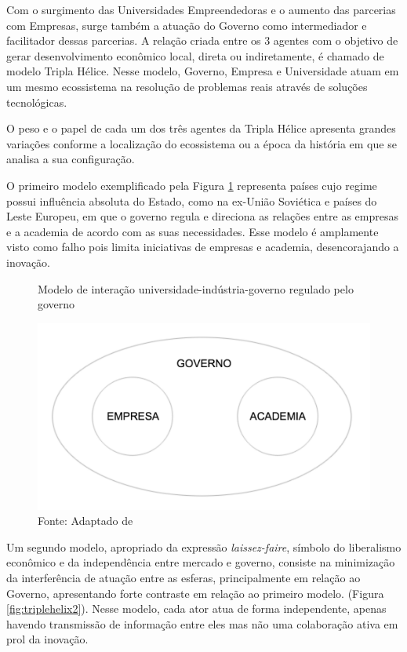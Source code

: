 Com o surgimento das Universidades Empreendedoras e o aumento das parcerias com Empresas, surge também a atuação do Governo como intermediador e facilitador dessas parcerias. A relação criada entre os 3 agentes com o objetivo de gerar desenvolvimento econômico local, direta ou indiretamente, é chamado de modelo Tripla Hélice. Nesse modelo, Governo, Empresa e Universidade atuam em um mesmo ecossistema na resolução de problemas reais através de soluções tecnológicas.

O peso e o papel de cada um dos três agentes da Tripla Hélice apresenta grandes variações conforme a localização do ecossistema ou a época da história em que se analisa a sua configuração. \cite{etzkowitz2000}

O primeiro modelo exemplificado pela Figura \ref{fig:triplehelix1} representa países  cujo regime possui influência absoluta do Estado, como na ex-União Soviética e países do Leste Europeu, em que o governo regula e direciona as relações entre as empresas e a academia de acordo com as suas necessidades. Esse modelo é amplamente visto como falho pois limita iniciativas de empresas e academia, desencorajando a inovação.

\begin{figure}[H]
\caption{Modelo de interação universidade-indústria-governo regulado pelo governo}
\centerline{\includegraphics[scale=0.5]{img/triplehelix1}}
\label{fig:triplehelix1}
\caption* {Fonte: Adaptado de }
\end{figure}

Um segundo modelo, apropriado da expressão \textit{laissez-faire}, símbolo do liberalismo econômico e da independência entre mercado e governo, consiste na minimização da interferência de atuação entre as esferas, principalmente em relação ao Governo, apresentando forte contraste em relação ao primeiro modelo. (Figura \ref{fig:triplehelix2}). Nesse modelo, cada ator atua de forma independente, apenas havendo transmissão de informação entre eles mas não uma colaboração ativa em prol da inovação.


